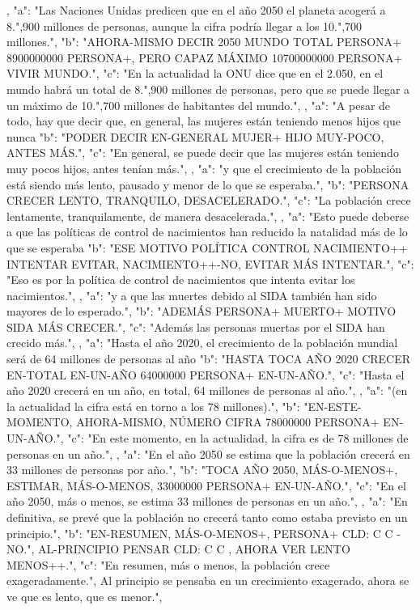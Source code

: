 ,
{
"a": "Las Naciones Unidas predicen que en el año 2050 el planeta acogerá a 8.",900 millones de personas, aunque la cifra podría llegar a los 10.",700 millones.",
"b": "AHORA-MISMO  DECIR 2050 MUNDO TOTAL PERSONA+ 8900000000 PERSONA+, PERO CAPAZ MÁXIMO 10700000000 PERSONA+ VIVIR MUNDO.",
"c": "En la actualidad la ONU dice que en el 2.050, en el mundo habrá un total de 8.",900 millones de personas, pero que se puede llegar a un máximo de 10.",700 millones de habitantes del mundo.",
}
,
{
"a": "A pesar de todo, hay que decir que, en general, las mujeres están teniendo menos hijos que nunca
"b": "PODER DECIR EN-GENERAL MUJER+ HIJO MUY-POCO, ANTES MÁS.",
"c": "En general, se puede decir que las mujeres están teniendo muy pocos hijos, antes tenían más.",
}
,
{
"a": "y que el crecimiento de la población está siendo más lento, pausado y menor de lo que se esperaba.",
"b": "PERSONA CRECER LENTO, TRANQUILO, DESACELERADO.",
"c": "La población crece lentamente, tranquilamente, de manera desacelerada.",
}
,
{
"a": "Esto puede deberse a que las políticas de control de nacimientos han reducido la natalidad más de lo que se esperaba
"b": "ESE MOTIVO POLÍTICA CONTROL NACIMIENTO++ INTENTAR EVITAR, NACIMIENTO++-NO, EVITAR MÁS INTENTAR.",
"c": "Eso es por la política de control de nacimientos que intenta evitar los nacimientos.",
}
,
{
"a": "y a que las muertes debido al SIDA también han sido mayores de lo esperado.",
"b": "ADEMÁS PERSONA+ MUERTO+ MOTIVO SIDA MÁS CRECER.",
"c": "Además las personas muertas por el SIDA han crecido más.",
}
,
{
"a": "Hasta el año 2020, el crecimiento de la población mundial será de 64 millones de personas al año
"b": "HASTA TOCA AÑO 2020 CRECER EN-TOTAL EN-UN-AÑO 64000000 PERSONA+ EN-UN-AÑO.",
"c": "Hasta el año 2020 crecerá en un año, en total, 64 millones de personas al año.",
}
,
{
"a": "(en la actualidad la cifra está en torno a los 78 millones).",
"b": "EN-ESTE-MOMENTO, AHORA-MISMO, NÚMERO CIFRA 78000000 PERSONA+ EN-UN-AÑO.",
"c": "En este momento, en la actualidad, la cifra es de 78 millones de personas en un año.",
}
,
{
"a": "En el año 2050 se estima que la población crecerá en 33 millones de personas por año.",
"b": "TOCA AÑO 2050, MÁS-O-MENOS+, ESTIMAR, MÁS-O-MENOS, 33000000 PERSONA+ EN-UN-AÑO.",
"c": "En el año 2050, más o menos, se estima 33 millones de personas en un año.",
}
,
{
"a": "En definitiva, se prevé que la población no crecerá tanto como estaba previsto en un principio.",
"b": "EN-RESUMEN, MÁS-O-MENOS+, PERSONA+ CLD: C C -NO.", AL-PRINCIPIO PENSAR CLD: C C , AHORA VER LENTO MENOS++.",
"c": "En resumen, más o menos, la población crece exageradamente.", Al principio se pensaba en un crecimiento exagerado, ahora se ve que es lento, que es menor.",
}

